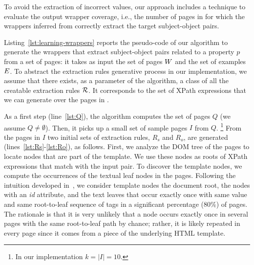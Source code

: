 

To avoid the extraction of incorrect values, our approach includes a technique to evaluate the output wrapper coverage, i.e., the number of pages in {\allpages} for which the wrappers inferred from {\somepages} correctly extract the target subject-object pairs. 


Listing~\ref{lst:learning-wrappers} reports the pseudo-code of our algorithm to generate the wrappers that extract subject-object pairs related to a property $p$ from a set of pages: 
%
it takes as input the set of pages $\mbox{\ensuremath{W}}$ and the set of examples ${\mbox{\ensuremath{E}}}$.
To abstract the extraction rules generative process in our implementation, we assume that there exists, as a parameter of the algorithm, a class of all the creatable extraction rules $\mathcal{R}$. It corresponds to the set of XPath expressions that we can generate over the pages in \allpages.



As a first step (line~\ref{lst:Q}), the algorithm computes the set of pages $Q$
(we assume $Q \neq \emptyset$).
Then, it picks up a small set of sample pages $I$ from $Q$.%
\footnote{In our implementation $k = |I| = 10$.}
%
From the pages in $I$ two initial sets of extraction rules, $R_s$ and $R_o$, are generated (lines~\ref{lst:Rs}-\ref{lst:Ro}), as follows. 
%
%
First, we analyze the DOM tree of the pages to locate nodes that are part 
of the template. We use these nodes as roots of XPath expressions that 
match with the input pair. To discover the template nodes, we compute the occurrences of the textual leaf nodes in the pages. Following the intuition developed in~\cite{exalg}, 
we consider template nodes the document root, the nodes with an {\em id} attribute, 
and  the text leaves that occur exactly once  with same value and same root-to-leaf sequence of tags in a significant 
percentage (80\%) of pages.  The rationale is that it is very unlikely that a node occurs exactly once in several pages with the same root-to-leaf path by chance; rather, it is likely repeated  in every page since it comes from a piece of the underlying HTML template.

